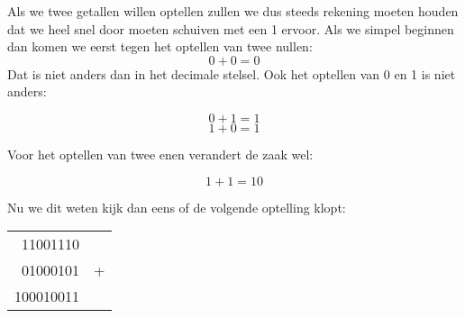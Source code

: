 Als we twee getallen willen optellen zullen we dus steeds rekening moeten houden dat we heel snel door moeten schuiven met een 1 ervoor. Als we simpel beginnen dan komen we eerst tegen het optellen van twee nullen:
\[ 0 + 0 = 0 \]
Dat is niet anders dan in het decimale stelsel. Ook het optellen van 0 en 1 is niet anders:

\[ 0 + 1 = 1 \]
\[ 1 + 0 = 1 \]

Voor het optellen van twee enen verandert de zaak wel:

\[ 1 + 1 = 10 \]

Nu we dit weten kijk dan eens of de volgende optelling klopt:

\begin{center}
\begin{tabular}{ r l }
	11001110 & \\
	01000101 & +\\
	\hline
	100010011 & \\
\end{tabular}
\end{center}

